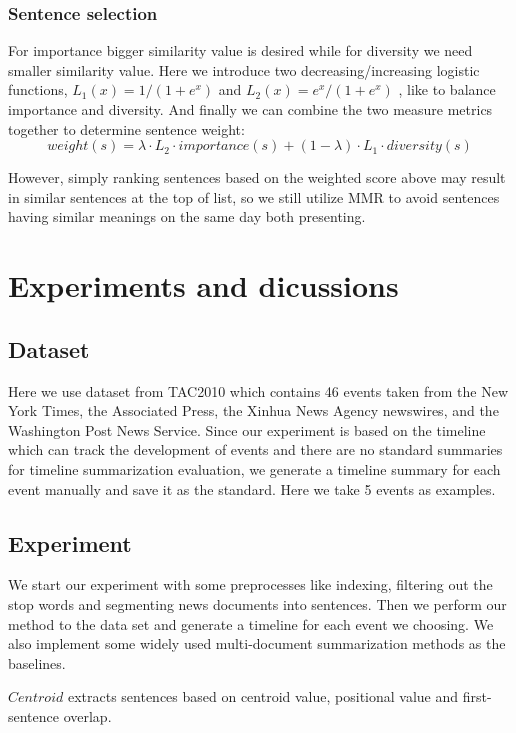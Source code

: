 \documentclass[runningheads,a4paper]{llncs}
\begin{document}
\subsubsection{Sentence selection}

For importance bigger similarity value is desired while for diversity we need smaller similarity value. Here we introduce two decreasing/increasing logistic functions,  $L_1(x) = 1/(1+e^x)$  and $L_2(x) = e^x / (1+e^x)$ , like \cite{2011-Yan-p745-754} to balance importance and diversity. And finally we can combine the two measure metrics together to determine sentence weight:
\begin{equation}
weight(s) = \lambda \cdot L_2 \cdot importance(s) + (1- \lambda ) \cdot L_1 \cdot  diversity(s)
\end{equation}

However, simply ranking sentences based on the weighted score above may result in similar sentences at the top of list, so we still utilize MMR \cite{1998-Carbonell-p335-336} to avoid sentences having similar meanings on the same day both presenting.

\section{Experiments and dicussions}
\subsection{Dataset}
Here we use dataset from TAC2010 which contains 46 events taken from the New York Times, the Associated Press, the Xinhua News Agency newswires, and the Washington Post News Service. Since our experiment is based on the timeline which can track the development of events and there are no standard summaries for timeline summarization evaluation, we generate a timeline summary for each event manually and save it as the standard. Here we take 5 events as examples.
\subsection{Experiment}

We start our experiment with some preprocesses like indexing, filtering out the stop words and segmenting news documents into sentences. Then we perform our method to the data set and generate a timeline for each event we choosing. We also implement some widely used multi-document summarization methods as the baselines.

$Centroid$ extracts sentences based on centroid value, positional value and first-sentence overlap.
\end{document}
